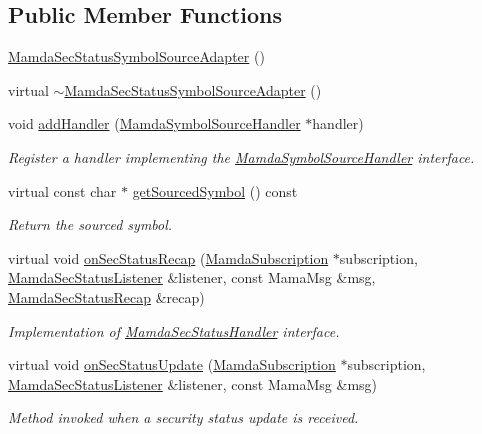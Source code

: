 \subsection*{Public Member Functions}
\begin{CompactItemize}
\item 
\hyperlink{classWombat_1_1MamdaSecStatusSymbolSourceAdapter_ab1ff4e29b6e34af13c02fa1fa90e3f0}{Mamda\-Sec\-Status\-Symbol\-Source\-Adapter} ()
\item 
virtual \hyperlink{classWombat_1_1MamdaSecStatusSymbolSourceAdapter_eefe3bdc4aebc9cbf00766a9e90898c3}{$\sim$Mamda\-Sec\-Status\-Symbol\-Source\-Adapter} ()
\item 
void \hyperlink{classWombat_1_1MamdaSecStatusSymbolSourceAdapter_85be28217f8f4eb344b96f460d085c06}{add\-Handler} (\hyperlink{classWombat_1_1MamdaSymbolSourceHandler}{Mamda\-Symbol\-Source\-Handler} $\ast$handler)
\begin{CompactList}\small\item\em Register a handler implementing the \hyperlink{classWombat_1_1MamdaSymbolSourceHandler}{Mamda\-Symbol\-Source\-Handler} interface. \item\end{CompactList}\item 
virtual const char $\ast$ \hyperlink{classWombat_1_1MamdaSecStatusSymbolSourceAdapter_1d8ac176b7946080fc1d7f665e5a19ed}{get\-Sourced\-Symbol} () const 
\begin{CompactList}\small\item\em Return the sourced symbol. \item\end{CompactList}\item 
virtual void \hyperlink{classWombat_1_1MamdaSecStatusSymbolSourceAdapter_a1a7e7d772ee646d2104beb1f764efba}{on\-Sec\-Status\-Recap} (\hyperlink{classWombat_1_1MamdaSubscription}{Mamda\-Subscription} $\ast$subscription, \hyperlink{classWombat_1_1MamdaSecStatusListener}{Mamda\-Sec\-Status\-Listener} \&listener, const Mama\-Msg \&msg, \hyperlink{classWombat_1_1MamdaSecStatusRecap}{Mamda\-Sec\-Status\-Recap} \&recap)
\begin{CompactList}\small\item\em Implementation of \hyperlink{classWombat_1_1MamdaSecStatusHandler}{Mamda\-Sec\-Status\-Handler} interface. \item\end{CompactList}\item 
virtual void \hyperlink{classWombat_1_1MamdaSecStatusSymbolSourceAdapter_4671f467c1425728565861501e610ba3}{on\-Sec\-Status\-Update} (\hyperlink{classWombat_1_1MamdaSubscription}{Mamda\-Subscription} $\ast$subscription, \hyperlink{classWombat_1_1MamdaSecStatusListener}{Mamda\-Sec\-Status\-Listener} \&listener, const Mama\-Msg \&msg)
\begin{CompactList}\small\item\em Method invoked when a security status update is received. \item\end{CompactList}\end{CompactItemize}


